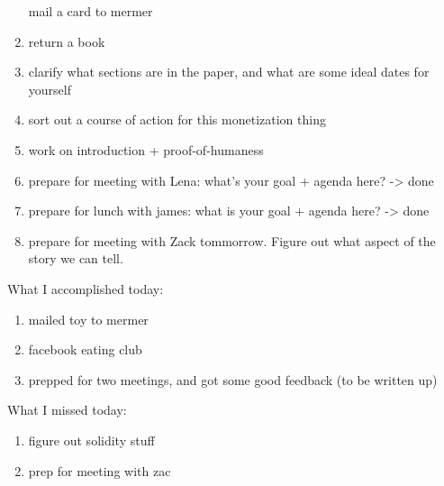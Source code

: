 \begin{enumerate}
	\item [mail a card to mermer]
	\item return a book
	\item clarify what sections are in the paper, and what are some ideal dates for yourself
	\item sort out a course of action for this monetization thing  
	\item work on introduction + proof-of-humaness 
	\item prepare for meeting with Lena: what's your goal + agenda here? -> done
	\item prepare for lunch with james: what is your goal + agenda here? -> done
	\item prepare for meeting with Zack tommorrow. Figure out what aspect of the story we can tell.
\end{enumerate}


What I accomplished today:

\begin{enumerate}
	\item mailed toy to mermer
	\item facebook eating club
	\item prepped for two meetings, and got some good feedback (to be written up)
\end{enumerate}

What I missed today: 

\begin{enumerate}
	\item figure out solidity stuff
	\item prep for meeting with zac
\end{enumerate}

